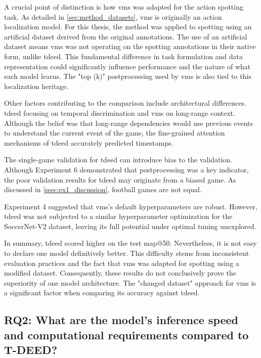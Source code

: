 A crucial point of distinction is how \acrshort{vms} was adapted for the action spotting task. As detailed in \cref{sec:method_datasets}, \acrshort{vms} is originally an action localization model. For this thesis, the method was applied to spotting using an artificial dataset derived from the original annotations. The use of an artificial dataset means \acrshort{vms} was not operating on the spotting annotations in their native form, unlike \acrshort{tdeed}. This fundamental difference in task formulation and data representation could significantly influence performance and the nature of what each model learns. The "top (k)" postprocessing used by \acrshort{vms} is also tied to this localization heritage.

Other factors contributing to the comparison include architectural differences. \acrshort{tdeed} focusing on temporal discrimination and \acrshort{vms} on long-range context. Although the belief was that long-range dependencies would use previous events to understand the current event of the game, the fine-grained attention mechanisms of \acrshort{tdeed} accurately predicted timestamps. 

The single-game validation for \acrshort{tdeed} can introduce bias to the validation. Although Experiment 6 demonstrated that postprocessing was a key indicator, the poor validation results for \acrshort{tdeed} may originate from a biased game. As discussed in \cref{ssec:ex1_discussion}, football games are not equal. 

Experiment 4 suggested that \acrshort{vms}'s default hyperparameters are robust. However, \acrshort{tdeed} was not subjected to a similar hyperparameter optimization for the SoccerNet-V2 dataset, leaving its full potential under optimal tuning unexplored.

In summary, \acrshort{tdeed} scored higher on the test \acrshort{map}@50. Nevertheless, it is not easy to declare one model definitively better. This difficulty stems from inconsistent evaluation practices and the fact that \acrshort{vms} was adapted for spotting using a modified dataset. Consequently, these results do not conclusively prove the superiority of one model architecture. The "changed dataset" approach for \acrshort{vms} is a significant factor when comparing its accuracy against \acrshort{tdeed}.


\subsection{RQ2: What are the model's inference speed and computational requirements compared to T-DEED?}

